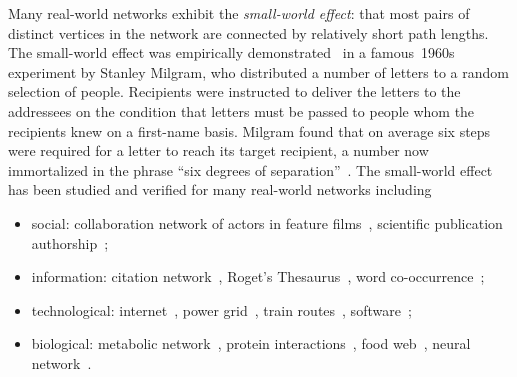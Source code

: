 Many real-world networks exhibit the
\emph{small-world effect}: that most pairs
of distinct vertices in the network are connected by relatively short
path lengths. The small-world effect was empirically
demonstrated~\cite{Milgram1967} in a famous~1960s experiment by
Stanley Milgram, who distributed a number
of letters to a random selection of people. Recipients were instructed
to deliver the letters to the addressees on the condition that letters
must be passed to people whom the recipients knew on a first-name
basis. Milgram found that on average six steps were required for a
letter to reach its target recipient, a number now immortalized in the
phrase ``six degrees of
separation''~\cite{Guare1990}. The small-world effect has been studied
and verified for many real-world networks including
\begin{itemize}
\item social: collaboration network of actors in
  feature films~\cite{AmaralEtAl2000,WattsStrogatz1998}, scientific
  publication
  authorship~\cite{CastroGrossman1999,GrossmanIon1995,Newman2001a,Newman2001b};

\item information: citation
  network~\cite{Redner1998}, Roget's
  Thesaurus~\cite{Knuth1993}, word
  co-occurrence~\cite{DorogovtsevMendes2001,FerrerSole2001};

\item technological:
  internet~\cite{ChenEtAl2002,FaloutsosEtAl1999}, power
  grid~\cite{WattsStrogatz1998}, train routes~\cite{SenEtAl2003},
  software~\cite{Newman2003a,ValverdeEtAl2002};

\item biological: metabolic
  network~\cite{JeongEtAl2000}, protein
  interactions~\cite{JeongEtAl2001}, food
  web~\cite{HuxhamEtAl1996,Martinez1991}, neural
  network~\cite{WattsStrogatz1998,WhiteEtAl1986}.
\end{itemize}

